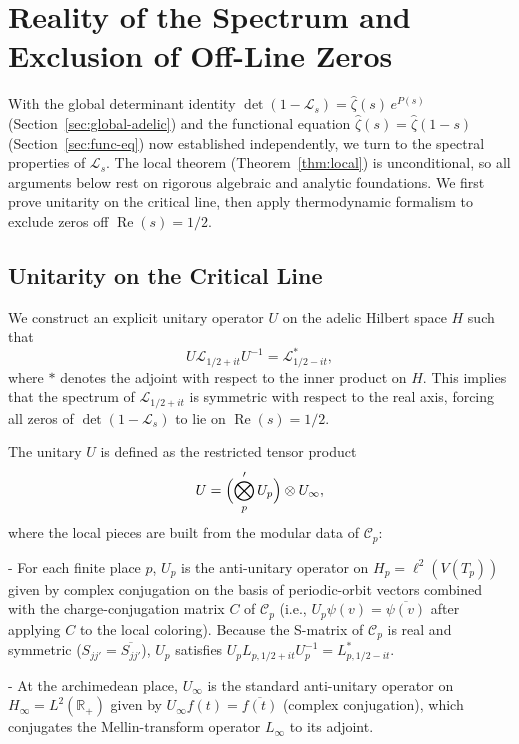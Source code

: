 \documentclass[11pt,a4paper]{amsart}
\begin{document}
\section{Reality of the Spectrum and Exclusion of Off-Line Zeros}
\label{sec:reality}

With the global determinant identity \(\det(1 - \mathcal{L}_s) = \hat{\zeta}(s) \, e^{P(s)}\) (Section~\ref{sec:global-adelic}) and the functional equation \(\hat{\zeta}(s) = \hat{\zeta}(1-s)\) (Section~\ref{sec:func-eq}) now established independently, we turn to the spectral properties of \(\mathcal{L}_s\). The local theorem (Theorem~\ref{thm:local}) is unconditional, so all arguments below rest on rigorous algebraic and analytic foundations. We first prove unitarity on the critical line, then apply thermodynamic formalism to exclude zeros off \(\operatorname{Re}(s)=1/2\).

\subsection{Unitarity on the Critical Line}
\label{subsec:unitarity}

We construct an explicit unitary operator \(U\) on the adelic Hilbert space \(H\) such that
\[
U \mathcal{L}_{1/2+it} U^{-1} = \mathcal{L}_{1/2-it}^*,
\]
where \(*\) denotes the adjoint with respect to the inner product on \(H\). This implies that the spectrum of \(\mathcal{L}_{1/2+it}\) is symmetric with respect to the real axis, forcing all zeros of \(\det(1 - \mathcal{L}_s)\) to lie on \(\operatorname{Re}(s)=1/2\).

The unitary \(U\) is defined as the restricted tensor product
\[
U = \Bigl( \bigotimes'_p U_p \Bigr) \otimes U_\infty,
\]
where the local pieces are built from the modular data of \(\mathcal{C}_p\):

- For each finite place \(p\), \(U_p\) is the anti-unitary operator on \(H_p = \ell^2(V(T_p))\) given by complex conjugation on the basis of periodic-orbit vectors combined with the charge-conjugation matrix \(C\) of \(\mathcal{C}_p\) (i.e., \(U_p \psi(v) = \overline{\psi(v)}\) after applying \(C\) to the local coloring). Because the S-matrix of \(\mathcal{C}_p\) is real and symmetric (\(S_{jj'} = \overline{S_{jj'}}\)), \(U_p\) satisfies \(U_p L_{p,1/2+it} U_p^{-1} = L_{p,1/2-it}^*\).

- At the archimedean place, \(U_\infty\) is the standard anti-unitary operator on \(H_\infty = L^2(\mathbb{R}_+)\) given by \(U_\infty f(t) = \overline{f(t)}\) (complex conjugation), which conjugates the Mellin-transform operator \(L_\infty\) to its adjoint.
\end{document}
